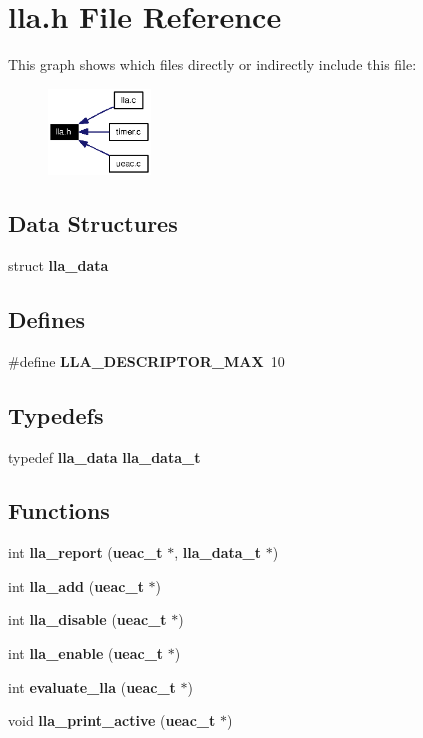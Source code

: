 \section{lla.h File Reference}
\label{lla_8h}


This graph shows which files directly or indirectly include this file:\begin{figure}[H]
\begin{center}
\leavevmode
\includegraphics[width=77pt]{lla_8h__dep__incl}
\end{center}
\end{figure}
\subsection*{Data Structures}
\begin{CompactItemize}
\item 
struct {\bf lla\_\-data}
\end{CompactItemize}
\subsection*{Defines}
\begin{CompactItemize}
\item 
\#define {\bf LLA\_\-DESCRIPTOR\_\-MAX}~10
\end{CompactItemize}
\subsection*{Typedefs}
\begin{CompactItemize}
\item 
typedef {\bf lla\_\-data} {\bf lla\_\-data\_\-t}
\end{CompactItemize}
\subsection*{Functions}
\begin{CompactItemize}
\item 
int {\bf lla\_\-report} ({\bf ueac\_\-t} $\ast$, {\bf lla\_\-data\_\-t} $\ast$)
\item 
int {\bf lla\_\-add} ({\bf ueac\_\-t} $\ast$)
\item 
int {\bf lla\_\-disable} ({\bf ueac\_\-t} $\ast$)
\item 
int {\bf lla\_\-enable} ({\bf ueac\_\-t} $\ast$)
\item 
int {\bf evaluate\_\-lla} ({\bf ueac\_\-t} $\ast$)
\item 
void {\bf lla\_\-print\_\-active} ({\bf ueac\_\-t} $\ast$)
\end{CompactItemize}
